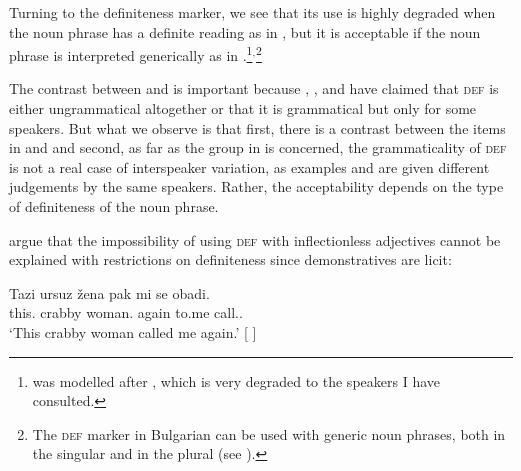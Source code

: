 \documentclass[output=paper]{langscibook}
\begin{document}
\noindent Turning to the definiteness marker, we see that its use is highly degraded when the noun phrase has a definite reading as in , but it is acceptable if the noun phrase is interpreted generically as in .\footnote{ was modelled after , which is very degraded to the speakers I have consulted.}$^,$\footnote{The \textsc{def} marker in Bulgarian can be used with generic noun phrases, both in the singular and in the plural (see \citealt[165]{Nicolova2017}).}

\z

\noindent The contrast between  and  is important because \citet{Halpern1995}, \citet{SpencerLuis2012}, and \citet{Adamson2019PhD} have claimed that \textsc{def} is either ungrammatical altogether or that it is grammatical but only for some speakers. But what we observe is that first, there is a contrast between the items in  and  and second, as far as the group in  is concerned, the grammaticality of \textsc{def} is not a real case of interspeaker variation, as examples  and  are given different judgements by the same speakers. Rather, the acceptability depends on the type of definiteness of the noun phrase. 

\citet[129]{SpencerLuis2012} argue that the impossibility of using \textsc{def} with inflectionless adjectives cannot be explained with restrictions on definiteness since demonstratives are licit: 

\ea \label{ge-ex-dem}
\gll Tazi ursuz \v{z}ena pak mi se obadi. \\
this.\F{} crabby woman.\F{} again to.me \Refl{} call.\Pst{}.\Tsg{} \\
\glt `This crabby woman called me again.' \hfill [\Dem{} ]
\z 
\end{document}
